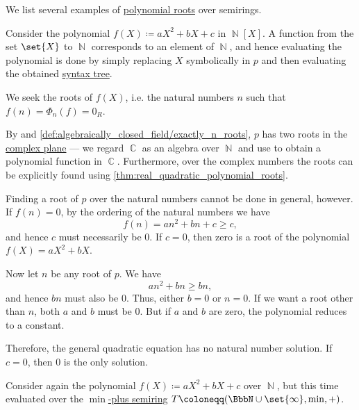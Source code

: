 \begin{example}\label{ex:polynomial_root}
  We list several examples of \hyperref[def:polynomial_root]{polynomial roots} over semirings.
  \begin{thmenum}
     Consider the polynomial \( f(X) \coloneqq aX^2 + bX + c \) in \( \BbbN[X] \). A function from the set \( \set{ X } \) to \( \BbbN \) corresponds to an element of \( \BbbN \), and hence evaluating the polynomial is done by simply replacing \( X \) symbolically in \( p \) and then evaluating the obtained \hyperref[def:fol_free_term_model]{syntax tree}.

    We seek the roots of \( f(X) \), i.e. the natural numbers \( n \) such that \( f(n) = \Phi_n(f) = 0_R \).

    By  and \cref{def:algebraically_closed_field/exactly_n_roots}, \( p \) has two roots in the \hyperref[def:complex_numbers]{complex plane} --- we regard \( \BbbC \) as an algebra over \( \BbbN \) and use  to obtain a polynomial function in \( \BbbC \). Furthermore, over the complex numbers the roots can be explicitly found using \cref{thm:real_quadratic_polynomial_roots}.

    Finding a root of \( p \) over the natural numbers cannot be done in general, however. If \( f(n) = 0 \), by the ordering of the natural numbers we have
    \begin{equation*}
      f(n) = an^2 + bn + c \geq c,
    \end{equation*}
    and hence \( c \) must necessarily be \( 0 \). If \( c = 0 \), then zero is a root of the polynomial \( f(X) = aX^2 + bX \).

    Now let \( n \) be any root of \( p \). We have
    \begin{equation*}
      an^2 + bn \geq bn,
    \end{equation*}
    and hence \( bn \) must also be \( 0 \). Thus, either \( b = 0 \) or \( n = 0 \). If we want a root other than \( n \), both \( a \) and \( b \) must be \( 0 \). But if \( a \) and \( b \) are zero, the polynomial reduces to a constant.

    Therefore, the general quadratic equation has no natural number solution. If \( c = 0 \), then \( 0 \) is the only solution.

     Consider again the polynomial \( f(X) \coloneqq aX^2 + bX + c \) over \( \BbbN \), but this time evaluated over the \hyperref[def:tropical_semiring]{\( \min \)-plus semiring} \( T \coloneqq (\BbbN \cup \set{ \infty }, \min, +) \).


\end{thmenum}
\end{example}
